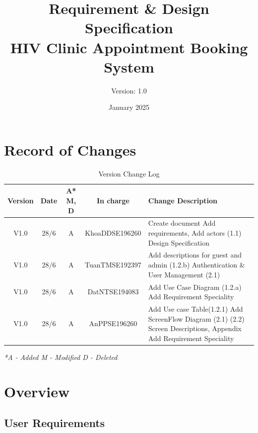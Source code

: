 \documentclass[12pt,a4paper]{article}
\title{\textbf{Requirement \& Design Specification\\HIV Clinic Appointment Booking System}}
\author{Version: 1.0}
\date{January 2025}
\begin{document}
\maketitle
\thispagestyle{empty}

\newpage

\section*{Record of Changes}

\begin{table}[h!]
\centering
\renewcommand{\arraystretch}{1.5}
\begin{tabular}{|c|c|c|c|p{7.5cm}|}
\hline
\textbf{Version} & \textbf{Date} & \textbf{A* M, D} & \textbf{In charge} & \textbf{Change Description} \\
\hline
V1.0 & 28/6 & A & KhoaDDSE196260 & 
Create document \newline
Add requirements, Add actors (1.1) \newline
Design Specification\\
\hline
V1.0 & 28/6 & A & TuanTMSE192397 & 
Add descriptions for guest and admin (1.2.b) \newline
Authentication \& User Management (2.1) \\
\hline
V1.0 & 28/6 & A & DatNTSE194083 & 
Add Use Case Diagram (1.2.a)\newline 
Add Requirement Speciality
\\
\hline
V1.0 & 28/6 & A & AnPPSE196260 & 
Add Use case Table(1.2.1)
Add ScreenFlow Diagram (2.1) \newline
(2.2) Screen Descriptions, Appendix\newline 
Add Requirement Speciality\\
\hline
\end{tabular}
\caption{Version Change Log}
\label{tab:version-log}
\end{table}



\textit{*A - Added M - Modified D - Deleted}

\newpage

\tableofcontents

\newpage

\section{Overview}

\subsection{User Requirements}
\end{document}
